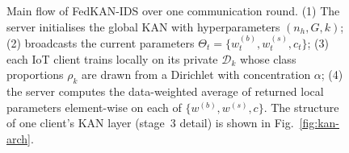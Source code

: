 \begin{figure}[!t]
\caption{Main flow of FedKAN-IDS over one communication round. (1) The server initialises the global KAN with hyperparameters $(n_h, G, k)$; (2) broadcasts the current parameters $\Theta_t = \{w^{(b)}_t, w^{(s)}_t, c_t\}$; (3) each IoT client trains locally on its private $\mathcal{D}_k$ whose class proportions $\rho_k$ are drawn from a Dirichlet with concentration $\alpha$; (4) the server computes the data-weighted average of returned local parameters element-wise on each of $\{w^{(b)}, w^{(s)}, c\}$. The structure of one client's KAN layer (stage~3 detail) is shown in Fig.~\ref{fig:kan-arch}.}
\label{fig:flow}
\end{figure}


